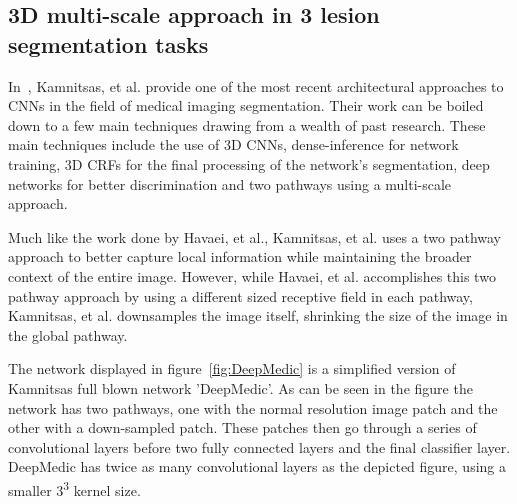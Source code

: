 \documentclass{sig-alternate}
\begin{document}
\subsection{3D multi-scale approach in 3 lesion segmentation tasks}
\label{sec:3DMultiScale}

In~\cite{Kamnitsas:2017}, Kamnitsas, et al. provide one of the most recent architectural approaches to CNNs in the field of medical imaging segmentation. Their work can be boiled down to a few main techniques drawing from a wealth of past research. These main techniques include the use of 3D CNNs, dense-inference for network training, 3D CRFs for the final processing of the network's segmentation, deep networks for better discrimination and two pathways using a multi-scale approach.

Much like the work done by Havaei, et al., Kamnitsas, et al. uses a two pathway approach to better capture local information while maintaining the broader context of the entire image. However, while Havaei, et al. accomplishes this two pathway approach by using a different sized receptive field in each pathway, Kamnitsas, et al. downsamples the image itself, shrinking the size of the image in the global pathway.


\begin{figure*}
\centering
{}
\caption{The basic neural network architecture used by Kamnitsas, et al. in~\cite{Kamnitsas:2017}}
\label{fig:DeepMedic}
\end{figure*}

The network displayed in figure~\ref{fig:DeepMedic} is a simplified version of Kamnitsas full blown network 'DeepMedic'. As can be seen in the figure the network has two pathways, one with the normal resolution image patch and the other with a down-sampled patch. These patches then go through a series of convolutional layers before two fully connected layers and the final classifier layer. DeepMedic has twice as many convolutional layers as the depicted figure, using a smaller 3\textsuperscript{3} kernel size.
\end{document}
